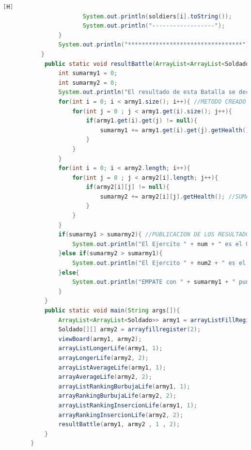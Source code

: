 \documentclass{article}
\begin{document}
\begin{lstlisting}[language=java,caption={Las lineas de codigos del metodo creado:}][H]
					   System.out.println(soldiers[i].toString());
					   System.out.println("------------------");
				}
				System.out.println("*********************************");
		   }
			public static void resultBattle(ArrayList<ArrayList<Soldado>> army1, Soldado[][] army2, int num, int num2){
				int sumarmy1 = 0;
				int sumarmy2 = 0;
				System.out.println("El resultado de esta Batalla se decidio por el nivel de fuerza de cada ejercito por lo que el resultado es: ...");
				for(int i = 0; i < army1.size(); i++){ //METODO CREADO QUE NOS PERMITE DAR CON UN GANADOR ESTO GRACIAS AL NIVEL DE PUNTOS DE VIDA O FUERZA DE CADA EJERCITO EL CUAL VAMOS SUMANDO DE CADA EJERCITO PARA DESPUES COMPARARLOS Y DECIDIR EL RESULTADO DE ESTA BATALLA
					for(int j = 0 ; j < army1.get(i).size(); j++){
						if(army1.get(i).get(j) != null){
							sumarmy1 += army1.get(i).get(j).getHealth(); //SUMA DE PUNTOS DEL EJERCITO 1
						}
					}
				}
				for(int i = 0; i < army2.length; i++){
					for(int j = 0 ; j < army2[i].length; j++){
						if(army2[i][j] != null){
							sumarmy2 += army2[i][j].getHealth(); //SUMA DE PUNTOS DEL EJERCITO 2
						}
					}
				}
				if(sumarmy1 > sumarmy2){ //PUBLICACION DE LOS RESULTADOS
					System.out.println("El Ejercito " + num + " es el GANADOR con " + sumarmy1 + " puntos");
				}else if(sumarmy2 > sumarmy1){
					System.out.println("El Ejercito " + num2 + " es el GANADOR con " + sumarmy2 + " puntos");
				}else{
					System.out.println("EMPATE con " + sumarmy1 + " puntos");
				}
			}
			public static void main(String args[]){
				ArrayList<ArrayList<Soldado>> army1 = arrayListFillRegister(1);
				Soldado[][] army2 = arrayfillregister(2);
				viewBoard(army1, army2);
				arrayListLongerLife(army1, 1);
				arrayLongerLife(army2, 2);
				arrayListAverageLife(army1, 1);
				arrayAverageLife(army2, 2);
				arrayListRankingBurbujaLife(army1, 1);
				arrayRankingBurbujaLife(army2, 2);
				arrayListRankingInsercionLife(army1, 1);
				arrayRankingInsercionLife(army2, 2);
				resultBattle(army1, army2 , 1 , 2);
			}
		}
	\end{lstlisting}
\end{document}
